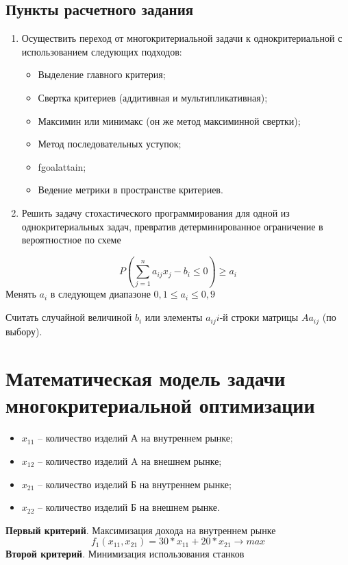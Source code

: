 \subsection{Пункты расчетного задания}
\begin{enumerate}
\item Осуществить переход от многокритериальной задачи к однокритериальной с использованием следующих подходов:
\begin{itemize}
\item Выделение главного критерия;
\item Свертка критериев (аддитивная и мультипликативная);
\item Максимин или минимакс (он же метод максиминной свертки);
\item Метод последовательных уступок;
\item fgoalattain;
\item Ведение метрики в пространстве критериев.
\end{itemize}
\item Решить задачу стохастического программирования для одной из однокритериальных задач, превратив детерминированное ограничение в вероятностное по схеме
\end{enumerate}
\begin{equation}
P(\sum_{j=1}^{n} a_{ij}x_j-b_i\leq 0)\geq a_i
\end{equation}
Менять $a_i$ в следующем диапазоне $0,1\leq a_i\leq 0,9$
 
Считать случайной величиной $b_i$ или элементы ${a_{ij} i}$-й строки матрицы $A{a_{ij}}$ (по выбору).

\section{Математическая модель задачи многокритериальной оптимизации}
\begin{itemize}
\item $x_{11}$ – количество изделий А на внутреннем рынке;
\item $x_{12}$ – количество изделий A на внешнем рынке;
\item $x_{21}$ – количество изделий Б на внутреннем рынке;
\item $x_{22}$ – количество изделий Б на внешнем рынке.
\end{itemize}
\textbf{Первый критерий}. Максимизация дохода на внутреннем рынке
\begin{equation}
f_1 (x_{11}, x_{21})=30*x_{11}+20*x_{21} \rightarrow max 
\end{equation}
\textbf{Второй критерий}. Минимизация использования станков


